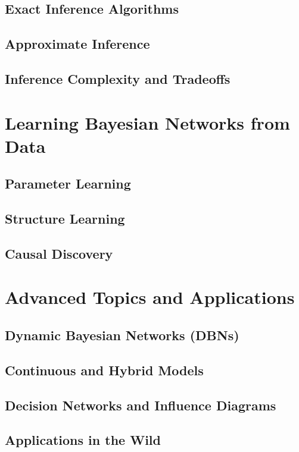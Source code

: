 \documentclass[12pt]{book}
\begin{document}
\chapter{Exact Inference Algorithms}
\chapter{Approximate Inference}
\chapter{Inference Complexity and Tradeoffs}

\part{Learning Bayesian Networks from Data}
\chapter{Parameter Learning}
\chapter{Structure Learning}
\chapter{Causal Discovery}

\part{Advanced Topics and Applications}
\chapter{Dynamic Bayesian Networks (DBNs)}
\chapter{Continuous and Hybrid Models}
\chapter{Decision Networks and Influence Diagrams}
\chapter{Applications in the Wild}

\backmatter
\end{document}
